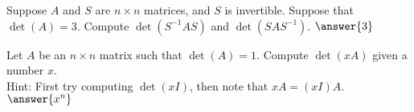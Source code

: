 \documentclass{ximera}
\begin{document}
\begin{exercise}
    Suppose $A$ and $S$ are $n \times n$ matrices, and $S$ is invertible. Suppose that $\det(A) = 3$.  Compute $\det(S^{-1}AS)$ and $\det(SAS^{-1})$. $\answer{3}$ %
\end{exercise}

\begin{exercise}
    Let $A$ be an $n \times n$ matrix such that $\det(A)=1$. Compute $\det(x A)$ given a number $x$.\\ Hint: First try computing $\det(xI)$, then note that $xA = (xI)A$. $\answer{x^n}$ 
\end{exercise}
%
\end{document}
